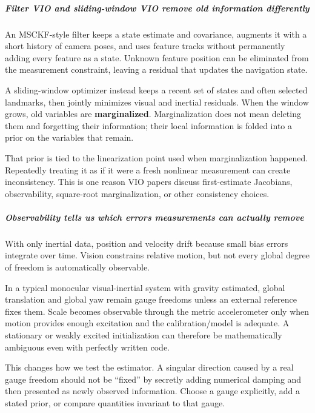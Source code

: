 \subparagraph{Filter VIO and sliding-window VIO remove old information differently}\label{04-visual-computing-ii-ch035-filter-vio-and-sliding-window-vio-remove-old-information-differently}

An MSCKF-style filter keeps a state estimate and covariance, augments it with a short history of camera poses, and uses feature tracks without permanently adding every feature as a state. Unknown feature position can be eliminated from the measurement constraint, leaving a residual that updates the navigation state.

A sliding-window optimizer instead keeps a recent set of states and often selected landmarks, then jointly minimizes visual and inertial residuals. When the window grows, old variables are \textbf{marginalized}. Marginalization does not mean deleting them and forgetting their information; their local information is folded into a prior on the variables that remain.

That prior is tied to the linearization point used when marginalization happened. Repeatedly treating it as if it were a fresh nonlinear measurement can create inconsistency. This is one reason VIO papers discuss first-estimate Jacobians, observability, square-root marginalization, or other consistency choices.

\subparagraph{Observability tells us which errors measurements can actually remove}\label{04-visual-computing-ii-ch035-observability-tells-us-which-errors-measurements-can-actually-remove}

With only inertial data, position and velocity drift because small bias errors integrate over time. Vision constrains relative motion, but not every global degree of freedom is automatically observable.

In a typical monocular visual-inertial system with gravity estimated, global translation and global yaw remain gauge freedoms unless an external reference fixes them. Scale becomes observable through the metric accelerometer only when motion provides enough excitation and the calibration/model is adequate. A stationary or weakly excited initialization can therefore be mathematically ambiguous even with perfectly written code.

This changes how we test the estimator. A singular direction caused by a real gauge freedom should not be ``fixed'' by secretly adding numerical damping and then presented as newly observed information. Choose a gauge explicitly, add a stated prior, or compare quantities invariant to that gauge.

